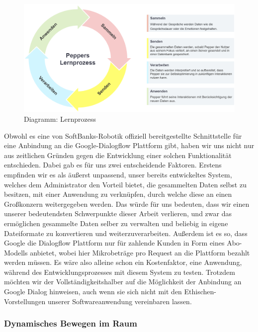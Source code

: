 \begin{figure}[H]
    \includegraphics[width=\textwidth]{Figures/pepper-lerprozess.png}
    \caption{Diagramm: Lernprozess}
    \label{fig:integration}
    \centering
\end{figure}

Obwohl es eine von SoftBanks-Robotik offiziell bereitgestellte Schnittstelle für eine Anbindung an die Google-Dialogflow Plattform gibt, haben wir uns nicht nur aus zeitlichen Gründen gegen die Entwicklung einer solchen Funktionalität entschieden. Dabei gab es für uns zwei entscheidende Faktoren. Erstens empfinden wir es als äußerst unpassend, unser bereits entwickeltes System, welches dem Administrator den Vorteil bietet, die gesammelten Daten selbst zu besitzen, mit einer Anwendung zu verknüpfen, durch welche diese an einen Großkonzern weitergegeben werden. Das würde für uns bedeuten, dass wir einen unserer bedeutendsten Schwerpunkte dieser Arbeit verlieren, und zwar das ermöglichen gesammelte Daten selber zu verwalten und beliebig in eigene Dateiformate zu konvertieren und weiterzuverarbeiten. Außerdem ist es so, dass Google die Dialogflow Plattform nur für zahlende Kunden in Form eines Abo-Modells anbietet, wobei hier Mikrobeträge pro Request an die Plattform bezahlt werden müssen. Es wäre also alleine schon ein Kostenfaktor, eine Anwendung, während des Entwicklungsprozesses mit diesem System zu testen. Trotzdem möchten wir der Vollständigkeitshalber auf die Möglichkeit der Anbindung an Google Dialog hinweisen, auch wenn sie sich nicht mit den Ethischen-Vorstellungen unserer Softwareanwendung vereinbaren lassen.\\

\subsubsection{Dynamisches Bewegen im Raum}

